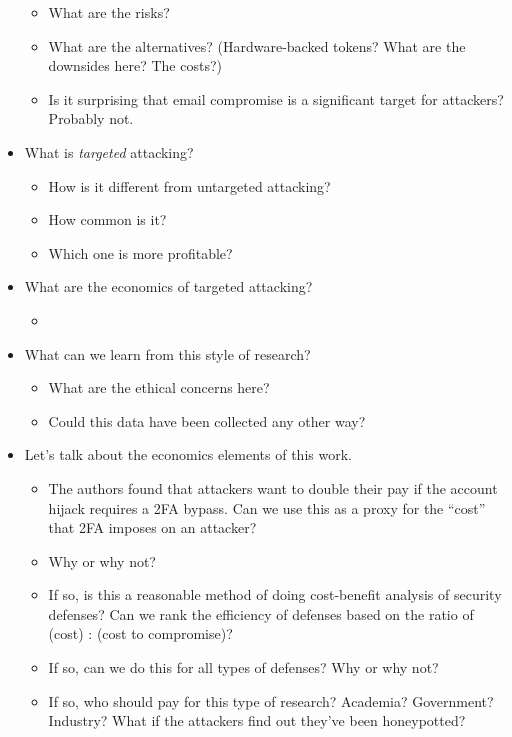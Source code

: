 \documentclass[11pt]{article}
\begin{document}
\begin{itemize}
\begin{itemize}
        \item What are the risks?
        \item What are the alternatives? (Hardware-backed tokens? What are the downsides here? The costs?)
        \item Is it surprising that email compromise is a significant target for attackers? Probably not. 
    \end{itemize}
    \item What is {\it targeted } attacking? 
    \begin{itemize}
        \item How is it different from untargeted attacking?
        \item How common is it?
        \item Which one is more profitable?
    \end{itemize}
    \item What are the economics of targeted attacking?
    \begin{itemize}
        \item 
    \end{itemize}
    \item What can we learn from this style of research?
    \begin{itemize}
        \item What are the ethical concerns here?
        \item Could this data have been collected any other way?
    \end{itemize}
    \item Let's talk about the economics elements of this work.
    \begin{itemize}
        \item The authors found that attackers want to double their pay if the account hijack requires a 2FA bypass. Can we use this as a proxy for the ``cost'' that 2FA imposes on an attacker?
        \item Why or why not?
        \item If so, is this a reasonable method of doing cost-benefit analysis of security defenses? Can we rank the efficiency of defenses based on the ratio of (cost) : (cost to compromise)?
        \item If so, can we do this for all types of defenses? Why or why not? 
        \item If so, who should pay for this type of research? Academia? Government? Industry? What if the attackers find out they've been honeypotted?
    \end{itemize}

\end{itemize}
\end{document}
